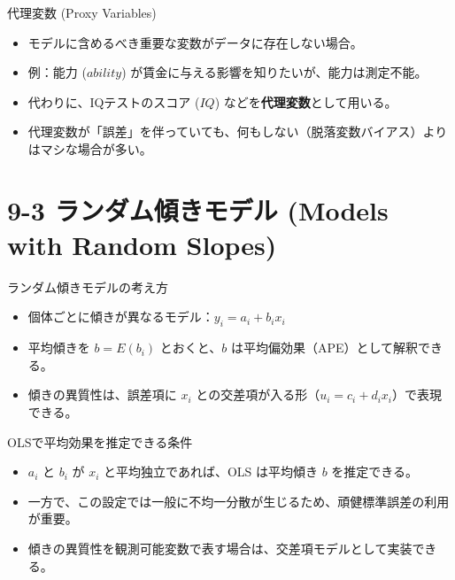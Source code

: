 \documentclass[
  ignorenonframetext,
]{beamer}
\providecommand{\tightlist}{%
  \setlength{\itemsep}{0pt}\setlength{\parskip}{0pt}}
\begin{document}
\begin{frame}{代理変数 (Proxy Variables)}
\label{ux4ee3ux7406ux5909ux6570-proxy-variables}
\begin{itemize}
\tightlist
\item
  モデルに含めるべき重要な変数がデータに存在しない場合。
\item
  例：能力 (\(ability\))
  が賃金に与える影響を知りたいが、能力は測定不能。
\item
  代わりに、IQテストのスコア (\(IQ\))
  などを\textbf{代理変数}として用いる。
\item
  代理変数が「誤差」を伴っていても、何もしない（脱落変数バイアス）よりはマシな場合が多い。
\end{itemize}
\end{frame}

\section{9-3 ランダム傾きモデル (Models with Random
Slopes)}\label{ux30e9ux30f3ux30c0ux30e0ux50beux304dux30e2ux30c7ux30eb-models-with-random-slopes}

\begin{frame}{ランダム傾きモデルの考え方}
\label{ux30e9ux30f3ux30c0ux30e0ux50beux304dux30e2ux30c7ux30ebux306eux8003ux3048ux65b9}
\begin{itemize}
\tightlist
\item
  個体ごとに傾きが異なるモデル：\(y_i = a_i + b_i x_i\)
\item
  平均傾きを \(b = E(b_i)\) とおくと、\(b\)
  は平均偏効果（APE）として解釈できる。
\item
  傾きの異質性は、誤差項に \(x_i\)
  との交差項が入る形（\(u_i = c_i + d_i x_i\)）で表現できる。
\end{itemize}
\end{frame}

\begin{frame}{OLSで平均効果を推定できる条件}
\label{olsux3067ux5e73ux5747ux52b9ux679cux3092ux63a8ux5b9aux3067ux304dux308bux6761ux4ef6}
\begin{itemize}
\tightlist
\item
  \(a_i\) と \(b_i\) が \(x_i\) と平均独立であれば、OLS は平均傾き \(b\)
  を推定できる。
\item
  一方で、この設定では一般に不均一分散が生じるため、頑健標準誤差の利用が重要。
\item
  傾きの異質性を観測可能変数で表す場合は、交差項モデルとして実装できる。
\end{itemize}
\end{frame}
\end{document}
